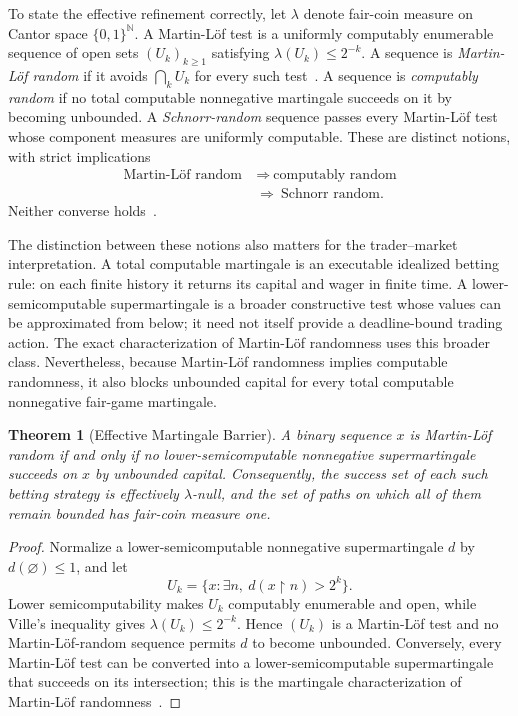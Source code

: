 \documentclass[aps,pra,reprint,superscriptaddress,amsmath,amssymb,floatfix]{revtex4-2}
\theoremstyle{plain}
\newtheorem{theorem}{Theorem}
\theoremstyle{definition}
\theoremstyle{remark}
\begin{document}
To state the effective refinement correctly, let \(\lambda\) denote fair-coin
measure on Cantor space \(\{0,1\}^{\mathbb N}\). A Martin-L\"of test is a
uniformly computably enumerable sequence of open sets
\((U_k)_{k\geq1}\) satisfying \(\lambda(U_k)\leq2^{-k}\). A sequence is
\emph{Martin-L\"of random} if it avoids \(\bigcap_k U_k\) for every such
test~\cite{MartinLof1966}. A sequence is \emph{computably random} if no total
computable nonnegative martingale succeeds on it by becoming unbounded. A
\emph{Schnorr-random} sequence passes every Martin-L\"of test whose component
measures are uniformly computable. These are distinct notions, with strict
implications
\begin{equation}
  \begin{aligned}
    \text{Martin-L\"of random}
      &\ \Longrightarrow\ \text{computably random}\\
      &\ \Longrightarrow\ \text{Schnorr random}.
  \end{aligned}
  \label{eq:randomhierarchy}
\end{equation}
Neither converse holds~\cite{schnorr1,Nies2009,DH}.

The distinction between these notions also matters for the trader--market
interpretation. A total computable martingale is an executable idealized
betting rule: on each finite history it returns its capital and wager in finite
time. A lower-semicomputable supermartingale is a broader constructive test
whose values can be approximated from below; it need not itself provide a
deadline-bound trading action. The exact characterization of Martin-L\"of
randomness uses this broader class. Nevertheless, because Martin-L\"of
randomness implies computable randomness, it also blocks unbounded capital for
every total computable nonnegative fair-game martingale.

\begin{theorem}[Effective Martingale Barrier]
  \label{thm:effective}
  A binary sequence \(x\) is Martin-L\"of random if and only if no
  lower-semicomputable nonnegative supermartingale succeeds on \(x\) by
  unbounded capital. Consequently, the success set of each such betting
  strategy is effectively \(\lambda\)-null, and the set of paths on which all
  of them remain bounded has fair-coin measure one.
\end{theorem}

\begin{proof}
Normalize a lower-semicomputable nonnegative supermartingale \(d\) by
\(d(\varnothing)\leq1\), and let
\[
  U_k=\{x:\exists n,\ d(x{\upharpoonright}n)>2^k\}.
\]
Lower semicomputability makes \(U_k\) computably enumerable and open, while
Ville's inequality gives \(\lambda(U_k)\leq2^{-k}\). Hence
\((U_k)\) is a Martin-L\"of test and no Martin-L\"of-random sequence permits
\(d\) to become unbounded. Conversely, every Martin-L\"of test can be converted
into a lower-semicomputable supermartingale that succeeds on its intersection;
this is the martingale characterization of Martin-L\"of
randomness~\cite{calude:02,Nies2009}.
\end{proof}
\end{document}

